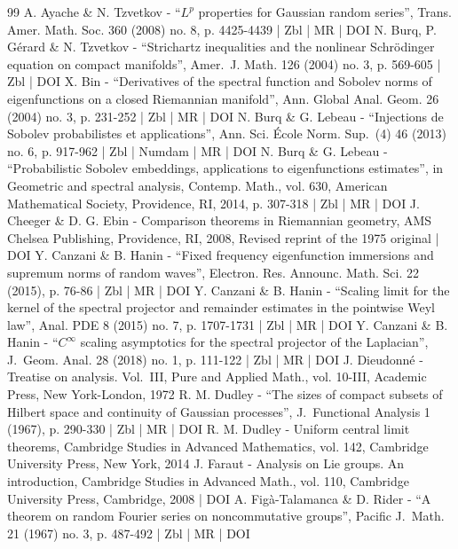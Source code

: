 \documentclass[10pt]{amsart}
\theoremstyle{theorem}
\theoremstyle{definition}
\begin{document}
\begin{thebibliography}{99}
A. Ayache \& N. Tzvetkov - “$L^p$ properties for Gaussian random series”, Trans. Amer. Math. Soc. 360 (2008) no. 8, p. 4425-4439 | Zbl | MR | DOI
N. Burq, P. Gérard \& N. Tzvetkov - “Strichartz inequalities and the nonlinear Schrödinger equation on compact manifolds”, Amer. J. Math. 126 (2004) no. 3, p. 569-605 | Zbl | DOI
X. Bin - “Derivatives of the spectral function and Sobolev norms of eigenfunctions on a closed Riemannian manifold”, Ann. Global Anal. Geom. 26 (2004) no. 3, p. 231-252 | Zbl | MR | DOI
N. Burq \& G. Lebeau - “Injections de Sobolev probabilistes et applications”, Ann. Sci. École Norm. Sup. (4) 46 (2013) no. 6, p. 917-962 | Zbl | Numdam | MR | DOI
N. Burq \& G. Lebeau - “Probabilistic Sobolev embeddings, applications to eigenfunctions estimates”, in Geometric and spectral analysis, Contemp. Math., vol. 630, American Mathematical Society, Providence, RI, 2014, p. 307-318 | Zbl | MR | DOI
J. Cheeger \& D. G. Ebin - Comparison theorems in Riemannian geometry, AMS Chelsea Publishing, Providence, RI, 2008, Revised reprint of the 1975 original | DOI
Y. Canzani \& B. Hanin - “Fixed frequency eigenfunction immersions and supremum norms of random waves”, Electron. Res. Announc. Math. Sci. 22 (2015), p. 76-86 | Zbl | MR | DOI
Y. Canzani \& B. Hanin - “Scaling limit for the kernel of the spectral projector and remainder estimates in the pointwise Weyl law”, Anal. PDE 8 (2015) no. 7, p. 1707-1731 | Zbl | MR | DOI
Y. Canzani \& B. Hanin - “$C^\infty $ scaling asymptotics for the spectral projector of the Laplacian”, J. Geom. Anal. 28 (2018) no. 1, p. 111-122 | Zbl | MR | DOI
J. Dieudonné - Treatise on analysis. Vol. III, Pure and Applied Math., vol. 10-III, Academic Press, New York-London, 1972
R. M. Dudley - “The sizes of compact subsets of Hilbert space and continuity of Gaussian processes”, J. Functional Analysis 1 (1967), p. 290-330 | Zbl | MR | DOI
R. M. Dudley - Uniform central limit theorems, Cambridge Studies in Advanced Mathematics, vol. 142, Cambridge University Press, New York, 2014
J. Faraut - Analysis on Lie groups. An introduction, Cambridge Studies in Advanced Math., vol. 110, Cambridge University Press, Cambridge, 2008 | DOI
A. Figà-Talamanca \& D. Rider - “A theorem on random Fourier series on noncommutative groups”, Pacific J. Math. 21 (1967) no. 3, p. 487-492 | Zbl | MR | DOI

\end{thebibliography}
\end{document}
